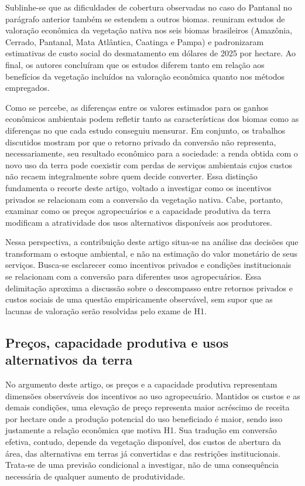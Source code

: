 Sublinhe-se que as dificuldades de cobertura observadas no caso do Pantanal no parágrafo anterior também se estendem a outros biomas.  reuniram estudos de valoração econômica da vegetação nativa nos seis biomas brasileiros (Amazônia, Cerrado, Pantanal, Mata Atlântica, Caatinga e Pampa) e padronizaram estimativas de custo social do desmatamento em dólares de 2025 por hectare. Ao final, os autores concluíram que os estudos diferem tanto em relação aos benefícios da vegetação incluídos na valoração econômica quanto nos métodos empregados. 

Como se percebe, as diferenças entre os valores estimados para os ganhos econômicos ambientais podem refletir tanto as características dos biomas como as diferenças no que cada estudo conseguiu mensurar. Em conjunto, os trabalhos discutidos mostram por que o retorno privado da conversão não representa, necessariamente, seu resultado econômico para a sociedade: a renda obtida com o novo uso da terra pode coexistir com perdas de serviços ambientais cujos custos não recaem integralmente sobre quem decide converter. Essa distinção fundamenta o recorte deste artigo, voltado a investigar como os incentivos privados se relacionam com a conversão da vegetação nativa. Cabe, portanto, examinar como os preços agropecuários e a capacidade produtiva da terra modificam a atratividade dos usos alternativos disponíveis aos produtores.

Nessa perspectiva, a contribuição deste artigo situa-se na análise das decisões que transformam o estoque ambiental, e não na estimação do valor monetário de seus serviços. Busca-se esclarecer como incentivos privados e condições institucionais se relacionam com a conversão para diferentes usos agropecuários. Essa delimitação aproxima a discussão sobre o descompasso entre retornos privados e custos sociais de uma questão empiricamente observável, sem supor que as lacunas de valoração serão resolvidas pelo exame de H1.

\subsection{Preços, capacidade produtiva e usos alternativos da terra}

No argumento deste artigo, os preços e a capacidade produtiva representam dimensões observáveis dos incentivos ao uso agropecuário. Mantidos os custos e as demais condições, uma elevação de preço representa maior acréscimo de receita por hectare onde a produção potencial do uso beneficiado é maior, sendo isso justamente a relação econômica que motiva H1. Sua tradução em conversão efetiva, contudo, depende da vegetação disponível, dos custos de abertura da área, das alternativas em terras já convertidas e das restrições institucionais. Trata-se de uma previsão condicional a investigar, não de uma consequência necessária de qualquer aumento de produtividade.


